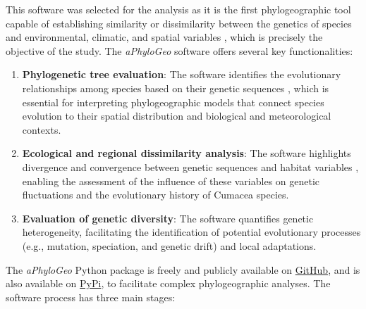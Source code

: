 This software was selected for the analysis as it is the first phylogeographic tool capable of establishing similarity or dissimilarity between the genetics of species and environmental, climatic, and spatial variables \citep{koshkarov_phylogeography_2022, li2023aphylogeo, li2024host}, which is precisely the objective of the study. The \textit{aPhyloGeo} software offers several key functionalities:

\begin{enumerate}[label=\arabic*.]
\item \textbf{Phylogenetic tree evaluation}: The software identifies the evolutionary relationships among species based on their genetic sequences \citep{koshkarov_phylogeography_2022, li2023aphylogeo, li2024host}, which is essential for interpreting phylogeographic models that connect species evolution to their spatial distribution and biological and meteorological contexts.

\item \textbf{Ecological and regional dissimilarity analysis}: The software highlights divergence and convergence between genetic sequences and habitat variables \citep{koshkarov_phylogeography_2022, li2023aphylogeo, li2024host}, enabling the assessment of the influence of these variables on genetic fluctuations and the evolutionary history of Cumacea species.

\item \textbf{Evaluation of genetic diversity}: The software quantifies genetic heterogeneity, facilitating the identification of potential evolutionary processes (e.g., mutation, speciation, and genetic drift) and local adaptations.
\end{enumerate}

The \textit{aPhyloGeo} Python package is freely and publicly available on \href{https://github.com/tahiri-lab/aPhyloGeo}{GitHub}, and is also available on \href{https://pypi.org/project/aphylogeo/}{PyPi}, to facilitate complex phylogeographic analyses. The software process has three main stages:

